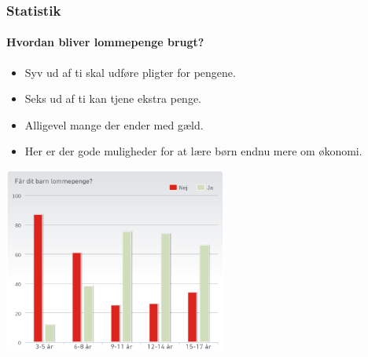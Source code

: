 
\begin{frame}
\frametitle{Statistik}
\framesubtitle{Hvordan bliver lommepenge brugt?} %

    \begin{multicols}{2}
  \noindent
	 	 \begin{itemize}
        	\item{Syv ud af ti skal udføre pligter for pengene.}
        	\item{Seks ud af ti kan tjene ekstra penge.}
        	\item{Alligevel mange der ender med gæld.}
        	\item{Her er der gode muligheder for at lære børn endnu mere om økonomi.}
    	\end{itemize}
 	\columnbreak
 	    \noindent
 	\includegraphics[width=0.55\textwidth]{../../Billeder/FaarBarnLommepenge.png}
    \end{multicols}
\end{frame}
    
